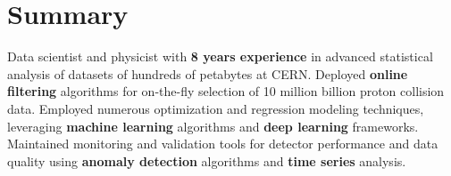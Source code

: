 \documentclass{myfancycv}
\begin{document}
\makeheader
\vspace*{-.35em}

  \vspace*{-0.5em}
\section{Summary}

Data scientist and physicist with {\bf 8 years experience} in advanced statistical analysis of datasets of hundreds of petabytes at CERN.
Deployed {\bf online filtering} algorithms for on-the-fly selection of 10 million billion proton collision data.
Employed numerous optimization and regression modeling techniques, leveraging {\bf machine learning} algorithms and {\bf deep learning} frameworks.
Maintained monitoring and validation tools for detector performance and data quality using {\bf anomaly detection} algorithms and {\bf time series} analysis.



\end{document}
